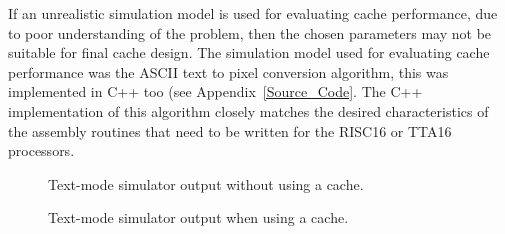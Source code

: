If an unrealistic simulation model is used for evaluating cache performance, due
to poor understanding of the problem, then the chosen parameters may not be
suitable for final cache design. The simulation model used for evaluating cache
performance was the ASCII text to pixel conversion algorithm, this was
implemented in C++ too (see Appendix~\ref{Source_Code}. The C++
implementation of this algorithm closely matches the desired characteristics of
the assembly routines that need to be written for the RISC16 or TTA16 processors.


\begin{figure}[h!]
\begin{center}
\caption[Text-mode simulator without a cache]{Text-mode simulator output without
using a cache.}
\label{Mem_No_Cache}
\end{center}
\end{figure}

\begin{figure}[h!]
\begin{center}
\caption[Text-mode simulator with a cache]{Text-mode simulator output when using
a cache.}
\label{Mem_With_Cache}
\end{center}
\end{figure}


